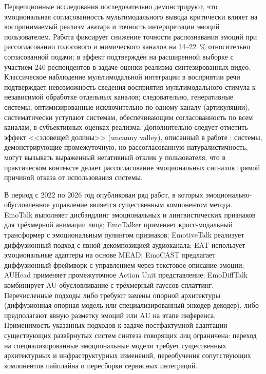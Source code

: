 \documentclass[a4paper, 12pt, oneside, openany]{article}
\begin{document}
Перцепционные исследования последовательно демонстрируют, что эмоциональная согласованность мультимодального вывода критически влияет на воспринимаемый реализм аватара и точность интерпретации эмоций пользователем. Работа \cite{suma2023} фиксирует снижение точности распознавания эмоций при рассогласовании голосового и мимического каналов на 14--22~\% относительно согласованной подачи; в \cite{zhou2025} эффект подтверждён на расширенной выборке с участием 240 респондентов в задаче оценки реализма синтезированных видео. Классическое наблюдение мультимодальной интеграции в восприятии речи \cite{mcgurk1976} подтверждает невозможность сведения восприятия мультимодального стимула к независимой обработке отдельных каналов; следовательно, генеративные системы, оптимизированные исключительно по одному каналу (артикуляции), систематически уступают системам, обеспечивающим согласованность по всем каналам, в субъективных оценках реализма. Дополнительно следует отметить эффект <<зловещей долины>> (uncanny valley), описанный в работе \cite{mori2012}: системы, демонстрирующие промежуточную, но рассогласованную натуралистичность, могут вызывать выраженный негативный отклик у пользователя, что в практическом контексте делает рассогласование эмоциональных сигналов прямой причиной отказа от использования системы.

В период с 2022 по 2026 год опубликован ряд работ, в которых эмоционально-обусловленное управление является существенным компонентом метода. EmoTalk \cite{peng2023emotalk} выполняет дисбэндлинг эмоциональных и лингвистических признаков для трёхмерной анимации лица; EmoTalker \cite{shen2024emotalker} применяет кросс-модальный трансформер с эмоциональным пулингом признаков; EmotiveTalk \cite{wang2025emotivetalk} реализует диффузионный подход с явной декомпозицией аудиоканала; EAT \cite{wang2023eat} использует эмоциональные адаптеры на основе MEAD; EmoCAST \cite{jiang2025emocast} предлагает диффузионный фреймворк с управлением через текстовое описание эмоции; AUHead \cite{lyu2026auhead} применяет промежуточное Action Unit представление; EmoDiffTalk \cite{liu2026emodifftalk} комбинирует AU-обусловливание с трёхмерный гауссов сплаттинг. Перечисленные подходы либо требуют замены опорной архитектуры (диффузионная опорная модель или специализированный энкодер-декодер), либо предполагают явную разметку эмоций или AU на этапе инференса. Применимость указанных подходов к задаче постфактумной адаптации существующих развёрнутых систем синтеза говорящих лиц ограничена: переход на специализированные эмоциональные модели требует существенных архитектурных и инфраструктурных изменений, переобучения сопутствующих компонентов пайплайна и пересборки сервисных интеграций.
\end{document}
